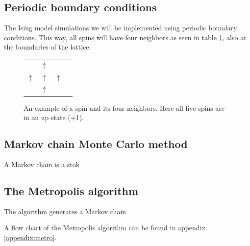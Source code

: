 \documentclass[english,notitlepage,reprint,nofootinbib]{revtex4-1}  %
\begin{document}
\subsection*{Periodic boundary conditions}
The Ising model simulations we will be implemented using periodic boundary conditions. This way, all spins will have four neighbors as seen in table \ref{fig:neighbors}, also at the boundaries of the lattice.
\begin{figure}[H]
    \centering
    \begin{tabular}{llll}
       & $\uparrow$ &    \\
    $\uparrow$ & $\uparrow$ & $\uparrow$ \\
       & $\uparrow$ & 
    \end{tabular}\label{fig:neighbors}
    \caption{An example of a spin and its four neighbors. Here all five spins are in an up state (+1).} 
\end{figure}

\subsection*{Markov chain Monte Carlo method}
A Markov chain is a stok

\subsection*{The Metropolis algorithm}
The algorithm generates a Markov chain 

A flow chart of the Metropolis algorithm can be found in appendix \ref{appendix:metro}.
\end{document}
